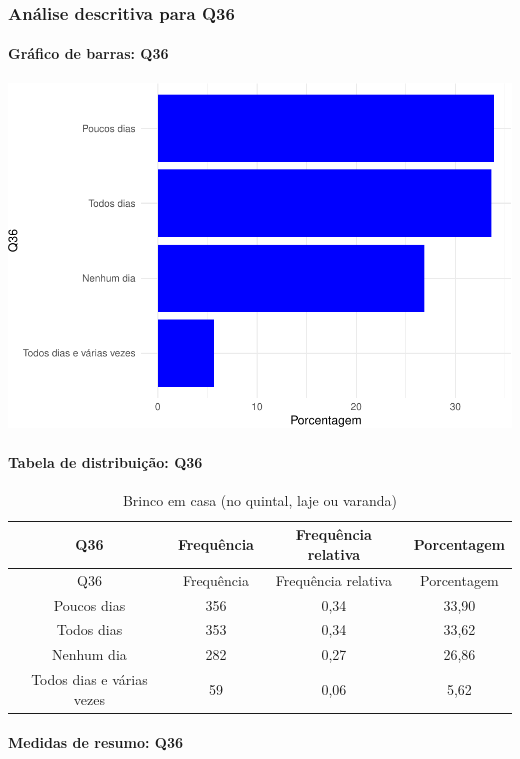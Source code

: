 \documentclass[]{article}
\let\oldparagraph\paragraph
\renewcommand{\paragraph}[1]{\oldparagraph{#1}\mbox{}}
\begin{document}
\hypertarget{anuxe1lise-descritiva-para-q36}{%
\subsubsection{Análise descritiva para Q36}\label{anuxe1lise-descritiva-para-q36}}

\hypertarget{gruxe1fico-de-barras-q36}{%
\paragraph{Gráfico de barras: Q36}\label{gruxe1fico-de-barras-q36}}

\begin{center}\includegraphics[width=0.75\linewidth]{relatorio_covid19_files/figure-latex/unnamed-chunk-1307-1} \end{center}

\hypertarget{tabela-de-distribuiuxe7uxe3o-q36}{%
\paragraph{Tabela de distribuição: Q36}\label{tabela-de-distribuiuxe7uxe3o-q36}}

\begin{longtable}[]{@{}cccc@{}}
\caption{\label{tab:unnamed-chunk-1308}Brinco em casa (no quintal, laje ou varanda)}\tabularnewline
\toprule
Q36 & Frequência & Frequência relativa & Porcentagem\tabularnewline
\midrule
\endfirsthead
\toprule
Q36 & Frequência & Frequência relativa & Porcentagem\tabularnewline
\midrule
\endhead
Poucos dias & 356 & 0,34 & 33,90\tabularnewline
Todos dias & 353 & 0,34 & 33,62\tabularnewline
Nenhum dia & 282 & 0,27 & 26,86\tabularnewline
Todos dias e várias vezes & 59 & 0,06 & 5,62\tabularnewline
\bottomrule
\end{longtable}

\hypertarget{medidas-de-resumo-q36}{%
\paragraph{Medidas de resumo: Q36}\label{medidas-de-resumo-q36}}
\end{document}
